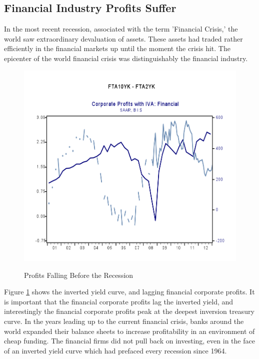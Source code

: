 \subsection{Financial Industry Profits Suffer}
In the most recent recession, associated with the term 'Financial Crisis,' the world saw extraordinary devaluation of assets.  These assets had traded rather efficiently in the financial markets up until the moment the crisis hit.  The epicenter of the world financial crisis was distinguishably the financial industry.

\begin{figure}[H]
\centering
\includegraphics[scale=.70]{figure/InvertedTbill2.png}\\[-0.7cm]
\caption{Profits Falling Before the Recession\label{fig:profFall}}
\end{figure}

Figure \ref{fig:profFall} shows the inverted yield curve, and lagging financial corporate profits.  It is important that the financial corporate profits lag the inverted yield, and interestingly the financial corporate profits peak at the deepest inversion treasury curve.  In the years leading up to the current financial crisis, banks around the world expanded their balance sheets to increase profitability in an environment of cheap funding.\cite{Kunt}  The financial firms did not pull back on investing, even in the face of an inverted yield curve which had prefaced every recession since 1964.  


